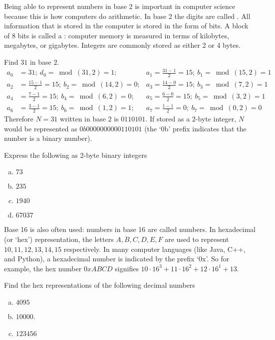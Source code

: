 Being able to represent numbers in base 2 is  important in computer science because this is how computers do arithmetic.  In base 2 the digits are called . All information that is stored in the computer is stored in the form of bits. A block of 8 bits is called a : computer memory is measured in terms of kilobytes, megabytes, or gigabytes. Integers are commonly stored as either 2 or 4 bytes.

\begin{example}\label{example:bases:convert to base 2}
Find  $31$ in base $2$.
\begin{align*}
a_{0}&=31;~d_{0}=\bmod(31,2)=1;&a_{1}=\frac{31-1}{2}=15;~b_{1}=\bmod(15,2)=1\\
a_{2}&=\frac{15-1}{2}=15;~b_{2}=\bmod(14,2)=0;&a_{3}=\frac{14-0}{2}=15;~b_{3}=\bmod(7,2)=1\\
a_{4}&=\frac{7-1}{2}=15;~b_{4}=\bmod(6,2)=0;&a_{5}=\frac{6-0}{2}=15;~b_{5}=\bmod(3,2)=1\\
a_{6}&=\frac{3-1}{2}=15;~b_{6}=\bmod(1,2)=1;&a_{7}=\frac{1-1}{2}=0;~b_{7}=\bmod(0,2)=0
\end{align*}
Therefore $N=31$ written in base $2$ is $0110101$. If stored as a 2-byte integer, $N$ would be represented as $0b0000000000110101$  (the `0b' prefix indicates that the number is a binary number).
\end{example}
\begin{exercise}\label{exercise:bases:numbers in base 2}
Express the following as 2-byte binary integers
\begin{enumerate}[(a)]
\item $73$
\item $235$
\item $1940$
\item $67037$
\end{enumerate} 
\end{exercise}

Base 16 is also often used: 
numbers in base 16 are called  numbers.  In hexadecimal (or `hex') representation, the letters $A,B,C,D,E,F$ are used to represent $10, 11, 12, 13,14, 15$ respectively.
In many computer languages (like Java, C++, and Python), a hexadecimal number is indicated by the prefix `0x'.  So for example, the hex number $0xABCD$ signifies
$10\cdot 16^3 + 11 \cdot 16^2 + 12 \cdot 16^1 + 13$.

\begin{exercise}\label{exercise:bases:hex}
Find the hex representations of the following decimal numbers
\begin{enumerate}[(a)]
\item $4095$
\item $10000$.
\item $123456$
\end{enumerate}
\end{exercise}

